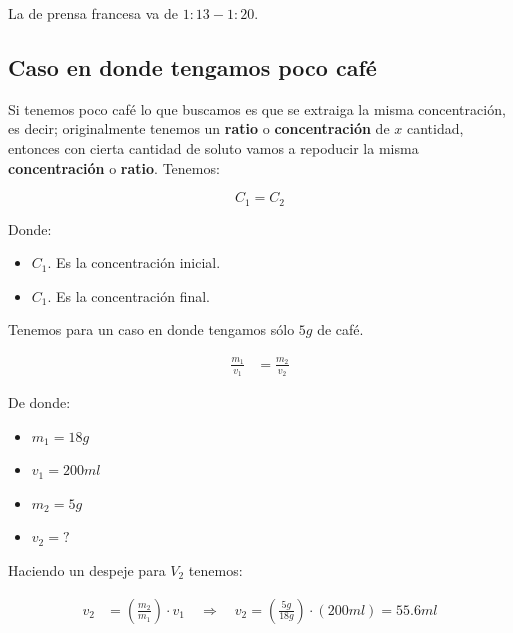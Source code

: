 \documentclass{article}
\begin{document}
La de prensa francesa va de $\boxed{1:13} - \boxed{1:20}$. 

\subsection{Caso en donde tengamos poco café}

Si tenemos poco café lo que buscamos es que se extraiga la misma concentración, es decir; originalmente tenemos un \textbf{ratio} o \textbf{concentración} de $x$ cantidad, entonces con cierta cantidad de soluto vamos a repoducir la misma \textbf{concentración} o \textbf{ratio}.  Tenemos:

\[ C_{1} = C_{2} \]

Donde: 

\begin{itemize}
\item[$\star$] $C_{1}$. Es la concentración inicial.\\
\item[$\star$] $C_{1}$. Es la concentración final.
\end{itemize}

Tenemos para un caso en donde tengamos sólo $5g$ de café.

\begin{equation}
\begin{split}
 \frac{m_{1}}{v_{1}} &= \frac{ m_{2} }{v_{2}}
\end{split} \label{eq:3}
\end{equation}

De donde: 

\begin{itemize}
\item[$\bullet$] $m_{1} = 18g$\\
\item[$\bullet$] $v_{1} = 200ml$\\
\item[$\bullet$] $m_{2} = 5g$\\
\item[$\bullet$] $v_{2} = ?$\\
\end{itemize}

Haciendo un despeje para $V_{2}$ tenemos:

\begin{equation}
\begin{split}
    v_{2} &= \left( \frac{ m_{2} }{m_{1}}  \right) \cdot v_{1} \quad \Rightarrow \quad v_{2} = \left( \frac{5g}{18g} \right) \cdot (200ml)  = 55\text{.}6ml
\end{split} 
\end{equation}
\end{document}

